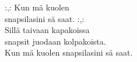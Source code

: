 
:,: Kun mä kuolen \\ snapsilasini sä saat. :,: \\ Sillä taivaan kapakoissa \\ snapsit juodaan kolpakoista. \\ Kun mä kuolen snapsilasini sä saat.